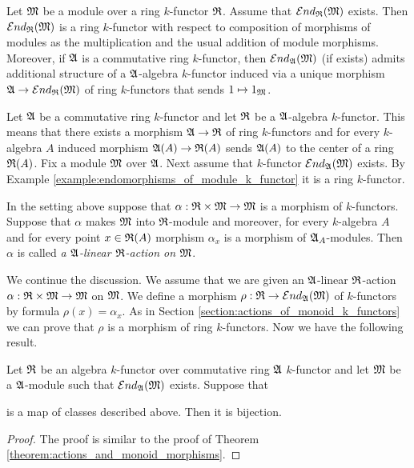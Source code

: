 \begin{example}\label{example:endomorphisms_of_module_k_functor}
Let ${\mathfrak M}$ be a module over a ring $k$-functor ${\mathfrak R}$. Assume that ${\mathcal E} nd_{{\mathfrak R}}({\mathfrak M})$ exists. Then ${\mathcal E} nd_{{\mathfrak R}}({\mathfrak M})$ is a ring $k$-functor with respect to composition of morphisms of modules as the multiplication and the usual addition of module morphisms. Moreover, if ${\mathfrak A}$ is a commutative ring $k$-functor, then ${\mathcal E} nd_{{\mathfrak A}}({\mathfrak M})$ (if exists) admits additional structure of a ${\mathfrak A}$-algebra $k$-functor induced via a unique morphism ${\mathfrak A}\rightarrow {\mathcal E} nd_{{\mathfrak R}}({\mathfrak M})$ of ring $k$-functors that sends $1\mapsto 1_{{\mathfrak M}}$.
\end{example}
\noindent
Let ${\mathfrak A}$ be a commutative ring $k$-functor and let ${\mathfrak R}$ be a ${\mathfrak A}$-algebra $k$-functor. This means that there exists a morphism ${\mathfrak A}\rightarrow {\mathfrak R}$ of ring $k$-functors and for every $k$-algebra $A$ induced morphism ${\mathfrak A}(A)\rightarrow {\mathfrak R}(A)$ sends ${\mathfrak A}(A)$ to the center of a ring ${\mathfrak R}(A)$. Fix a module ${\mathfrak M}$ over ${\mathfrak A}$. Next assume that $k$-functor ${\mathcal E} nd_{{\mathfrak A}}({\mathfrak M})$ exists. By Example \ref{example:endomorphisms_of_module_k_functor} it is a ring $k$-functor.

\begin{definition}
In the setting above suppose that $\alpha:{\mathfrak R}\times {\mathfrak M}\rightarrow {\mathfrak M}$ is a morphism of $k$-functors. Suppose that $\alpha$ makes ${\mathfrak M}$ into ${\mathfrak R}$-module and moreover, for every $k$-algebra $A$ and for every point $x\in {\mathfrak R}(A)$ morphism $\alpha_x$ is a morphism of ${\mathfrak A}_A$-modules. Then $\alpha$ is called \textit{a ${\mathfrak A}$-linear ${\mathfrak R}$-action on ${\mathfrak M}$}.
\end{definition}
\noindent
We continue the discussion. We assume that we are given an ${\mathfrak A}$-linear ${\mathfrak R}$-action $\alpha:{\mathfrak R}\times {\mathfrak M} \rightarrow {\mathfrak M}$ on ${\mathfrak M}$. We define a morphism $\rho:{\mathfrak R}\rightarrow {\mathcal E} nd_{{\mathfrak A}}({\mathfrak M})$ of $k$-functors by formula $\rho(x) = \alpha_x$. As in Section \ref{section:actions_of_monoid_k_functors} we can prove that $\rho$ is a morphism of ring $k$-functors. Now we have the following result.

\begin{theorem}\label{theorem:linear_morphisms_and_homomorphisms_of_rings}
Let ${\mathfrak R}$ be an algebra $k$-functor over commutative ring ${\mathfrak A}$ $k$-functor and let ${\mathfrak M}$ be a ${\mathfrak A}$-module such that ${\mathcal E} nd_{{\mathfrak A}}({\mathfrak M})$ exists. Suppose that
\begin{center}
\end{center}
is a map of classes described above. Then it is bijection.
\end{theorem}
\begin{proof}
The proof is similar to the proof of Theorem \ref{theorem:actions_and_monoid_morphisms}.
\end{proof}

